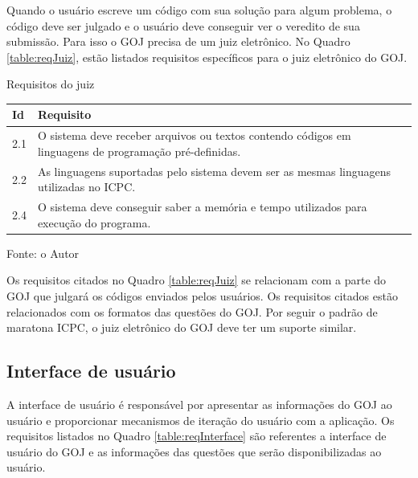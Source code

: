 Quando o usuário escreve um código com sua solução para algum problema, o código deve ser julgado e o usuário deve conseguir ver o veredito de sua submissão. Para isso o GOJ precisa de um juiz eletrônico. No Quadro \ref{table:reqJuiz}, estão listados requisitos específicos para o juiz eletrônico do GOJ.

\begin{quadro}
    \caption{Requisitos do juiz}
    \centering
    \label{table:reqJuiz}
    \begin{threeparttable}
    \begin{tabular}{ |p{0.6cm}|p{11cm}|  }
        \hline
        
        \textbf{Id} & 
        \textbf{Requisito} \\
        \hline
        
        2.1 & 
        O sistema deve receber arquivos ou textos contendo códigos em linguagens de programação pré-definidas. \\ 
        \hline
        
        2.2 & 
        As linguagens suportadas pelo sistema devem ser as mesmas linguagens utilizadas no ICPC. \\
        \hline
        
        2.4 & 
        O sistema deve conseguir saber a memória e tempo utilizados para execução do programa. \\
        \hline
    \end{tabular}
    \medskip
    \begin{tablenotes}
        \centering
        \item Fonte: o Autor
    \end{tablenotes}
    \end{threeparttable}
    
\end{quadro}

Os requisitos citados no Quadro \ref{table:reqJuiz} se relacionam com a parte do GOJ que julgará os códigos enviados pelos usuários. Os requisitos citados estão relacionados com os formatos das questões do GOJ. Por seguir o padrão de maratona ICPC, o juiz eletrônico do GOJ deve ter um suporte similar.

\subsection{Interface de usuário}
\label{subsec:ui}

A interface de usuário é responsável por apresentar as informações do GOJ ao usuário e proporcionar mecanismos de iteração do usuário com a aplicação. Os requisitos listados no Quadro \ref{table:reqInterface} são referentes a interface de usuário do GOJ e as informações das questões que serão disponibilizadas ao usuário.

